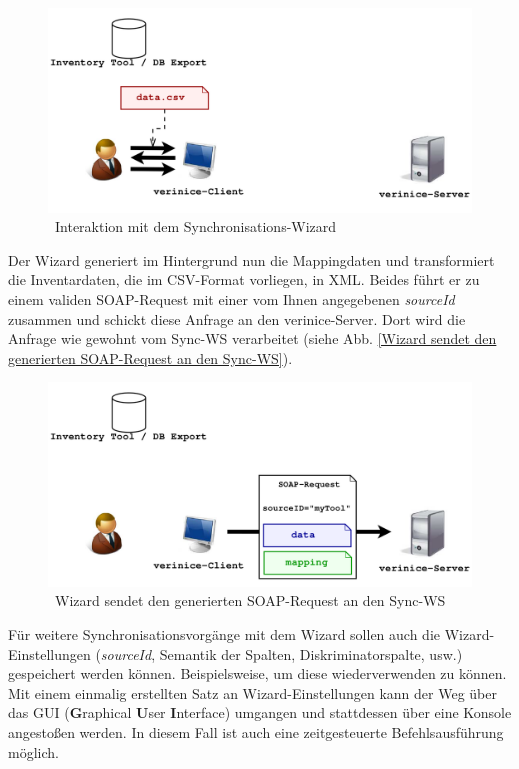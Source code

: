 \documentclass[a4paper,10pt]{book}
\begin{document}
\begin{figure}[htb!]
  \centering
  \includegraphics[scale=.28]{Screenshot/Use_case_verinice_wizard_02_03.png}
  \caption{\label{Interaktion mit dem Synchronisations-Wizard} \ Interaktion mit dem Synchronisations-Wizard}
\end{figure}

Der Wizard generiert im Hintergrund nun die Mappingdaten und transformiert die
Inventardaten, die im CSV-Format vorliegen, in XML. Beides führt er zu einem
validen SOAP-Request mit einer vom Ihnen angegebenen \textit{sourceId} zusammen
und schickt diese Anfrage an den verinice-Server. Dort wird die Anfrage wie
gewohnt vom Sync-WS verarbeitet (siehe Abb. \ref{Wizard sendet den generierten
SOAP-Request an den Sync-WS}).

\begin{figure}[htb!]
  \centering
  \includegraphics[scale=.28]{Screenshot/Use_case_verinice_wizard_03_03.png}
  \caption{\label{Wizard sendet den generierten SOAP-Request an den Sync-WS} \ Wizard sendet den generierten SOAP-Request an den Sync-WS}
\end{figure}

Für weitere Synchronisationsvorgänge mit dem Wizard sollen auch die
Wizard-Einstellungen (\textit{sourceId}, Semantik der Spalten,
Diskriminatorspalte, usw.) gespeichert werden können. Beispielsweise, um diese
wiederverwenden zu können. Mit einem einmalig erstellten Satz an
Wizard-Einstellungen kann der Weg über das GUI (\textbf{G}raphical \textbf{U}ser
\textbf{I}nterface) umgangen und stattdessen über eine Konsole angestoßen
werden. In diesem Fall ist auch eine zeitgesteuerte Befehlsausführung möglich.
\end{document}
